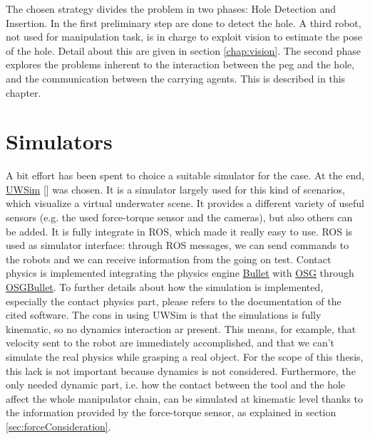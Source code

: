 The chosen strategy divides the problem in two phases: Hole Detection and Insertion. In the first preliminary step are done to detect the hole. A third robot, not used for manipulation task, is in charge to exploit vision to estimate the pose of the hole. Detail about this are given in section \ref{chap:vision}.
The second phase explores the problems inherent to the interaction between the peg and the hole, and the communication between the carrying agents. This is described in this chapter.
                          


\section{Simulators}
\label{sec:simulators}
A bit effort has been spent to choice a suitable simulator for the case. At the end, \href{http://www.irs.uji.es/uwsim/}{UWSim} [\cite{uwsim}] was chosen. It is a simulator largely used for this kind of scenarios, which visualize a virtual underwater scene. It provides a different variety of useful sensors (e.g. the used force-torque sensor and the cameras), but also others can be added. It is fully integrate in ROS, which made it really easy to use. ROS is used as simulator interface: through ROS messages, we can send commands to the robots and we can receive information from the going on test. Contact physics is implemented integrating the physics engine \href{https://pybullet.org/wordpress/}{Bullet} with \href{http://www.openscenegraph.org/}{OSG} through \href{https://github.com/mccdo/osgbullet}{OSGBullet}. To further details about how the simulation is implemented, especially the contact physics part, please refers to the documentation of the cited software. The cons in using UWSim is that the simulations is fully kinematic, so no dynamics interaction ar present. This means, for example, that velocity sent to the robot are immediately accomplished, and that we can't simulate the real physics while grasping a real object. For the scope of this thesis, this lack is not important because dynamics is not considered. Furthermore, the only needed dynamic part, i.e. how the contact between the tool and the hole affect the whole manipulator chain, can be simulated at kinematic level thanks to the information provided by the force-torque sensor, as explained in section \ref{sec:forceConsideration}.\\
